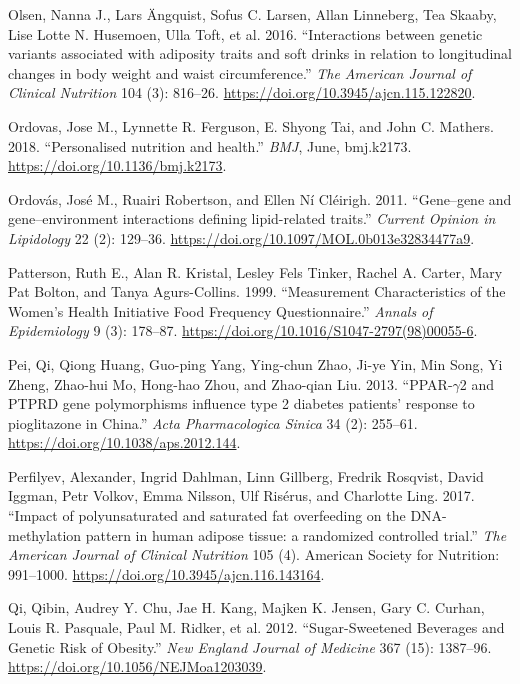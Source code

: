 \documentclass[]{article}
\begin{document}
\leavevmode\hypertarget{ref-Olsen2016}{}%
Olsen, Nanna J., Lars Ängquist, Sofus C. Larsen, Allan Linneberg, Tea
Skaaby, Lise Lotte N. Husemoen, Ulla Toft, et al. 2016. ``Interactions
between genetic variants associated with adiposity traits and soft
drinks in relation to longitudinal changes in body weight and waist
circumference.'' \emph{The American Journal of Clinical Nutrition} 104
(3): 816--26. \url{https://doi.org/10.3945/ajcn.115.122820}.

\leavevmode\hypertarget{ref-Ordovas2018}{}%
Ordovas, Jose M., Lynnette R. Ferguson, E. Shyong Tai, and John C.
Mathers. 2018. ``Personalised nutrition and health.'' \emph{BMJ}, June,
bmj.k2173. \url{https://doi.org/10.1136/bmj.k2173}.

\leavevmode\hypertarget{ref-Ordovas2011}{}%
Ordovás, José M., Ruairi Robertson, and Ellen Ní Cléirigh. 2011.
``Gene--gene and gene--environment interactions defining lipid-related
traits.'' \emph{Current Opinion in Lipidology} 22 (2): 129--36.
\url{https://doi.org/10.1097/MOL.0b013e32834477a9}.

\leavevmode\hypertarget{ref-Patterson1999}{}%
Patterson, Ruth E., Alan R. Kristal, Lesley Fels Tinker, Rachel A.
Carter, Mary Pat Bolton, and Tanya Agurs-Collins. 1999. ``Measurement
Characteristics of the Women's Health Initiative Food Frequency
Questionnaire.'' \emph{Annals of Epidemiology} 9 (3): 178--87.
\url{https://doi.org/10.1016/S1047-2797(98)00055-6}.

\leavevmode\hypertarget{ref-Pei2013}{}%
Pei, Qi, Qiong Huang, Guo-ping Yang, Ying-chun Zhao, Ji-ye Yin, Min
Song, Yi Zheng, Zhao-hui Mo, Hong-hao Zhou, and Zhao-qian Liu. 2013.
``PPAR-\(\gamma\)2 and PTPRD gene polymorphisms influence type 2
diabetes patients' response to pioglitazone in China.'' \emph{Acta
Pharmacologica Sinica} 34 (2): 255--61.
\url{https://doi.org/10.1038/aps.2012.144}.

\leavevmode\hypertarget{ref-Perfilyev2017}{}%
Perfilyev, Alexander, Ingrid Dahlman, Linn Gillberg, Fredrik Rosqvist,
David Iggman, Petr Volkov, Emma Nilsson, Ulf Risérus, and Charlotte
Ling. 2017. ``Impact of polyunsaturated and saturated fat overfeeding on
the DNA-methylation pattern in human adipose tissue: a randomized
controlled trial.'' \emph{The American Journal of Clinical Nutrition}
105 (4). American Society for Nutrition: 991--1000.
\url{https://doi.org/10.3945/ajcn.116.143164}.

\leavevmode\hypertarget{ref-Qi2012}{}%
Qi, Qibin, Audrey Y. Chu, Jae H. Kang, Majken K. Jensen, Gary C. Curhan,
Louis R. Pasquale, Paul M. Ridker, et al. 2012. ``Sugar-Sweetened
Beverages and Genetic Risk of Obesity.'' \emph{New England Journal of
Medicine} 367 (15): 1387--96.
\url{https://doi.org/10.1056/NEJMoa1203039}.
\end{document}
